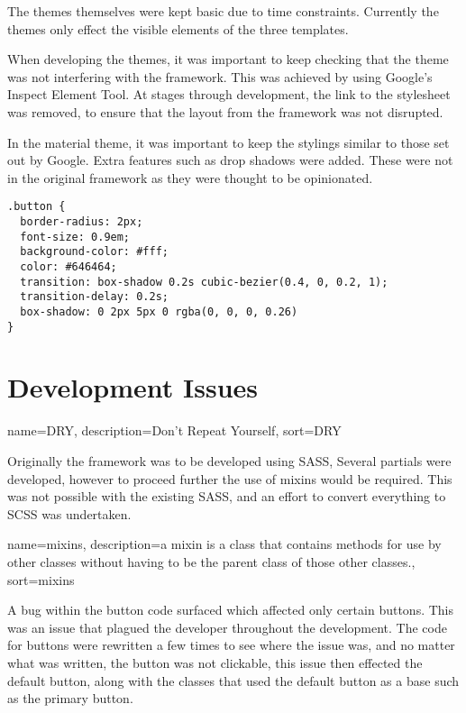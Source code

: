 \newpage
The themes themselves were kept basic due to time constraints. Currently the themes only effect the visible elements of the three templates. 

When developing the themes, it was important to keep checking that the theme was not interfering with the framework. This was achieved by using Google's Inspect Element Tool. At stages through development, the link to the stylesheet was removed, to ensure that the layout from the framework was not disrupted. 

In the material theme, it was important to keep the stylings similar to those set out by Google. Extra features such as drop shadows were added. These were not in the original framework as they were thought to be opinionated. 


\begin{lstlisting}[language=CSS3]
.button {
  border-radius: 2px;
  font-size: 0.9em;
  background-color: #fff;
  color: #646464;
  transition: box-shadow 0.2s cubic-bezier(0.4, 0, 0.2, 1);
  transition-delay: 0.2s;
  box-shadow: 0 2px 5px 0 rgba(0, 0, 0, 0.26)
}
\end{lstlisting}


\newpage
\section*{Development Issues}

{
  name={DRY},
  description={Don't Repeat Yourself},
  sort=DRY
}

Originally the framework was to be developed using \gls{SASS}, Several partials were developed, however to proceed further the use of \gls{mixins} would be required. This was not possible with the existing \gls{SASS}, and an effort to convert everything to \gls{SCSS} was undertaken.
 
{
  name={mixins},
  description={a mixin is a class that contains methods for use by other classes without having to be the parent class of those other classes.},
  sort=mixins
}

A bug within the button code surfaced which affected only certain buttons. This was an issue that plagued the developer throughout the development. The code for buttons were rewritten a few times to see where the issue was, and no matter what was written, the button was not clickable, this issue then effected the default button, along with the classes that used the default button as a base such as the primary button. 

